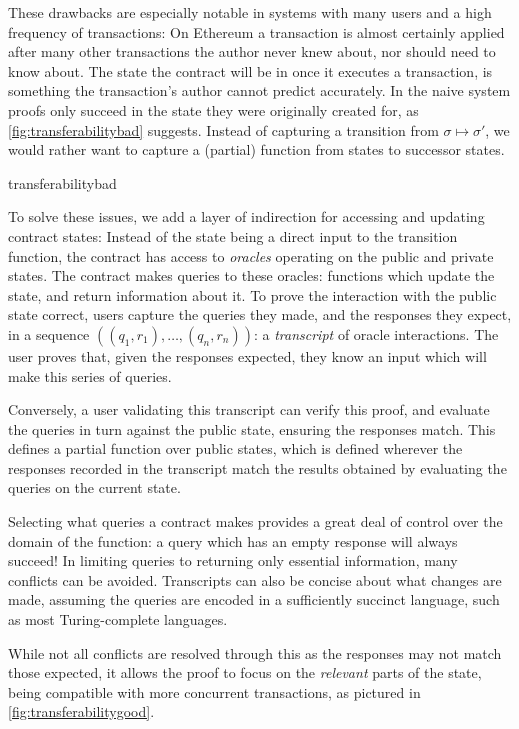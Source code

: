 These drawbacks are especially notable in systems with many users and a high
frequency of transactions: On Ethereum a transaction is almost
certainly applied after many other transactions the author never knew about, nor
should need to know about. The state the contract will be in once it executes
a transaction, is something the transaction's author cannot predict accurately. In the naive system
proofs only succeed in the state they were originally created for, as
\autoref{fig:transferabilitybad} suggests. Instead of capturing a transition
from $\sigma \mapsto \sigma'$, we would rather want to capture a (partial)
function from states to successor states.

{transferabilitybad}

To solve these issues, we add a layer of indirection for accessing and updating
contract states: Instead of the state being a direct input to the transition function, the
contract has access to \emph{oracles} operating on the public and private
states. The contract makes queries to these oracles: functions which update
the state, and return information about it. To prove the interaction with the
public state correct, users capture the queries they made, and
the responses they expect, in a sequence $((q_1, r_1), \ldots, (q_n, r_n))$: a
\emph{transcript} of oracle interactions. The user proves that, given the
responses expected, they know an input which will make this series of queries.

Conversely, a user validating this transcript can verify this proof, and
evaluate the queries in turn against the public state, ensuring the responses
match. This defines a partial function over public states, which is defined
wherever the responses recorded in the transcript match the results obtained by
evaluating the queries on the current state.

Selecting what queries a contract makes provides a great deal of control over
the domain of the function: a query which has an empty response will always
succeed! In limiting queries to returning only essential information, many
conflicts can be avoided. Transcripts can also be concise about what changes are
made, assuming the queries are encoded in a sufficiently succinct language, such
as most Turing-complete languages.

While not all conflicts are resolved through this as the responses may not match
those expected, it allows the proof to focus on the \emph{relevant} parts of the
state, being compatible with more concurrent transactions, as pictured in
\autoref{fig:transferabilitygood}.

